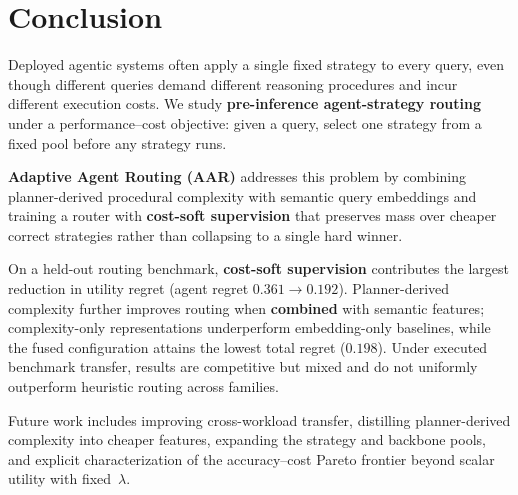 \section{Conclusion}
\label{sec:conclusion}

Deployed agentic systems often apply a single fixed strategy to every query, even though
different queries demand different reasoning procedures and incur different execution costs.
We study \textbf{pre-inference agent-strategy routing} under a performance--cost objective:
given a query, select one strategy from a fixed pool before any strategy runs.

\textbf{Adaptive Agent Routing (AAR)} addresses this problem by combining planner-derived
procedural complexity with semantic query embeddings and training a router with
\textbf{cost-soft supervision} that preserves mass over cheaper correct strategies rather
than collapsing to a single hard winner.

On a held-out routing benchmark, \textbf{cost-soft supervision} contributes the largest
reduction in utility regret (agent regret $0.361\to 0.192$).
Planner-derived complexity further improves routing when \textbf{combined} with semantic
features; complexity-only representations underperform embedding-only baselines, while the
fused configuration attains the lowest total regret ($0.198$).
Under executed benchmark transfer, results are competitive but mixed and do not uniformly
outperform heuristic routing across families.

Future work includes improving cross-workload transfer, distilling planner-derived complexity
into cheaper features, expanding the strategy and backbone pools, and explicit
characterization of the accuracy--cost Pareto frontier beyond scalar utility with fixed~$\lambda$.
